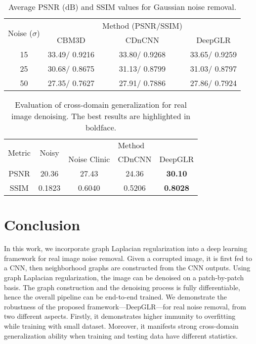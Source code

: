 \documentclass[10pt,twocolumn,letterpaper]{article}
\begin{document}
\begin{table}[htbp]
  \centering \scriptsize
  \caption{Average PSNR (dB) and SSIM values for Gaussian noise removal.}
    \begin{tabular}{c||c|c|c}
    \hline
    \multirow{2}[4]{*}{Noise ($\sigma$)} & \multicolumn{1}{c}{} & \multicolumn{1}{l|}{Method (PSNR/SSIM)} &  \bigstrut\\
\cline{2-4}          & CBM3D & CDnCNN & DeepGLR \bigstrut\\
    \hline
    \hline
    15    &  33.49/ 0.9216 & 33.80/ 0.9268 & 33.65/ 0.9259 \bigstrut\\
    \hline
    25    &  30.68/ 0.8675  & 31.13/ 0.8799 & 31.03/ 0.8797 \bigstrut\\
    \hline
    50    & 27.35/ 0.7627 & 27.91/ 0.7886 & 27.86/ 0.7924 \bigstrut\\
    \hline
    \end{tabular}%
  \label{tab:gaussian}%
\end{table}%


\begin{table}[htbp]
  \centering\scriptsize
  \caption{Evaluation of cross-domain generalization for real image denoising. The best results are highlighted in boldface.}
    \begin{tabular}{c|c||c|c|c}
    \hline
    \multirow{2}[4]{*}{Metric} & \multirow{2}[4]{*}{Noisy} & \multicolumn{3}{c}{\vspace{-1.0pt}$\phantom{\hat{I}}\mathop{\textrm{Method} }\limits_{\phantom{.}}\phantom{\hat{I}}$} \bigstrut\\
\cline{3-5}          &   & Noise Clinic & CDnCNN & DeepGLR  \bigstrut[t]\\
    \hline
    \hline
    PSNR  & 20.36   & 27.43 & 24.36& \textbf{30.10} \bigstrut[t]\\
    \hline
    SSIM & 0.1823   &0.6040 & 0.5206& \textbf{0.8028}  \bigstrut[b]\\
    \hline
    \end{tabular}%
  \label{tab:crossdomain}%
\end{table}%



\section{Conclusion}\label{sec:conclusion}
In this work, we incorporate graph Laplacian regularization into a deep learning framework for real image noise removal. 
Given a corrupted image, it is first fed to a CNN, then neighborhood graphs are constructed from the CNN outputs. 
Using graph Laplacian regularization, the image can be denoised on a patch-by-patch basis. 
The graph construction and the denoising process is fully differentiable, hence the overall pipeline can be end-to-end trained. 
We demonstrate the robustness of the proposed framework---DeepGLR---for real noise removal, from two different aspects.
Firstly, it demonstrates higher immunity to overfitting while training with small dataset. 
Moreover, it manifests strong cross-domain generalization ability when training and testing data have different statistics.
\end{document}
